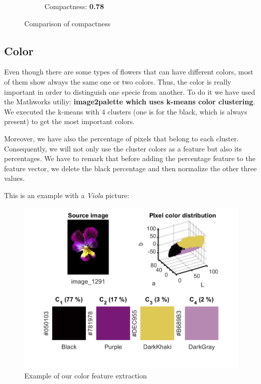 \documentclass[11]{article}
\begin{document}
\begin{figure}[H]
\begin{subfigure}[t]{.49\linewidth}
    \caption{Compactness: \textbf{0.78}}
    \label{skez}
    \end{subfigure}
    \caption{Comparison of compactness}
\end{figure}

\subsection{Color}
Even though there are some types of flowers that can have different colors, most of them show always the same one or two colors. Thus, the color is really important in order to distinguish one specie from another. To do it we have used  the Mathworks utiliy: \textbf{image2palette\cite{image2palette} which uses k-means color clustering}. We executed the k-means with 4 clusters (one is for the black, which is always present) to get the most important colors.

Moreover, we have also the percentage of pixels that belong to each cluster. Consequently, we will not only use the cluster colors as a feature but also its percentages. We have to remark that before adding the percentage feature to the feature vector, we delete the black percentage and then normalize the other three values.

\medskip

This is an example with a \textit{Viola} picture:
 
\begin{figure}[H]
	\centering
	\includegraphics[scale=0.85]{images/colorOriginal.png}
	\caption{Example of our color feature extraction}
	\label{color}
\end{figure}
\end{document}
